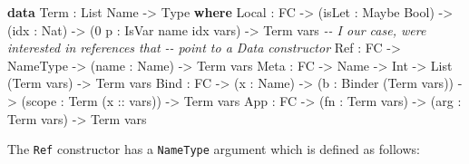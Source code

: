 \documentclass[
]{article}
\newenvironment{Shaded}{}{}
\newcommand{\CommentTok}[1]{\textcolor[rgb]{0.38,0.63,0.69}{\textit{#1}}}
\newcommand{\DataTypeTok}[1]{\textcolor[rgb]{0.56,0.13,0.00}{#1}}
\newcommand{\DecValTok}[1]{\textcolor[rgb]{0.25,0.63,0.44}{#1}}
\newcommand{\KeywordTok}[1]{\textcolor[rgb]{0.00,0.44,0.13}{\textbf{#1}}}
\newcommand{\NormalTok}[1]{#1}
\newcommand{\OperatorTok}[1]{\textcolor[rgb]{0.40,0.40,0.40}{#1}}
\newcommand{\OtherTok}[1]{\textcolor[rgb]{0.00,0.44,0.13}{#1}}
\begin{document}
\begin{Shaded}
\begin{Highlighting}[]
\KeywordTok{data} \DataTypeTok{Term} \OperatorTok{:} \DataTypeTok{List} \DataTypeTok{Name} \OtherTok{{-}\textgreater{}} \DataTypeTok{Type} \KeywordTok{where}
     \DataTypeTok{Local} \OperatorTok{:} \DataTypeTok{FC} \OtherTok{{-}\textgreater{}}\NormalTok{ (isLet }\OperatorTok{:} \DataTypeTok{Maybe} \DataTypeTok{Bool}\NormalTok{) }\OtherTok{{-}\textgreater{}}
\NormalTok{             (idx }\OperatorTok{:} \DataTypeTok{Nat}\NormalTok{) }\OtherTok{{-}\textgreater{}}\NormalTok{ (}\DecValTok{0}\NormalTok{ p }\OperatorTok{:} \DataTypeTok{IsVar}\NormalTok{ name idx vars) }\OtherTok{{-}\textgreater{}} \DataTypeTok{Term}\NormalTok{ vars}
     \CommentTok{{-}{-} I our case, we\textquotesingle{}re interested in references that }
     \CommentTok{{-}{-} point to a Data constructor}
     \DataTypeTok{Ref} \OperatorTok{:} \DataTypeTok{FC} \OtherTok{{-}\textgreater{}} \DataTypeTok{NameType} \OtherTok{{-}\textgreater{}}\NormalTok{ (name }\OperatorTok{:} \DataTypeTok{Name}\NormalTok{) }\OtherTok{{-}\textgreater{}} \DataTypeTok{Term}\NormalTok{ vars}
     \DataTypeTok{Meta} \OperatorTok{:} \DataTypeTok{FC} \OtherTok{{-}\textgreater{}} \DataTypeTok{Name} \OtherTok{{-}\textgreater{}} \DataTypeTok{Int} \OtherTok{{-}\textgreater{}} \DataTypeTok{List}\NormalTok{ (}\DataTypeTok{Term}\NormalTok{ vars) }\OtherTok{{-}\textgreater{}} \DataTypeTok{Term}\NormalTok{ vars}
     \DataTypeTok{Bind} \OperatorTok{:} \DataTypeTok{FC} \OtherTok{{-}\textgreater{}}\NormalTok{ (x }\OperatorTok{:} \DataTypeTok{Name}\NormalTok{) }\OtherTok{{-}\textgreater{}}
\NormalTok{            (b }\OperatorTok{:} \DataTypeTok{Binder}\NormalTok{ (}\DataTypeTok{Term}\NormalTok{ vars)) }\OtherTok{{-}\textgreater{}}
\NormalTok{            (scope }\OperatorTok{:} \DataTypeTok{Term}\NormalTok{ (}\OtherTok{x ::}\NormalTok{ vars)) }\OtherTok{{-}\textgreater{}} \DataTypeTok{Term}\NormalTok{ vars}
     \DataTypeTok{App} \OperatorTok{:} \DataTypeTok{FC} \OtherTok{{-}\textgreater{}}\NormalTok{ (fn }\OperatorTok{:} \DataTypeTok{Term}\NormalTok{ vars) }\OtherTok{{-}\textgreater{}}\NormalTok{ (arg }\OperatorTok{:} \DataTypeTok{Term}\NormalTok{ vars) }\OtherTok{{-}\textgreater{}} \DataTypeTok{Term}\NormalTok{ vars}
\end{Highlighting}
\end{Shaded}

The \texttt{Ref} constructor has a \texttt{NameType} argument which is
defined as follows:
\end{document}
